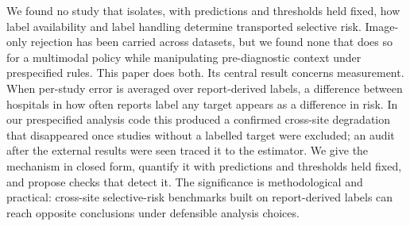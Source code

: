 We found no study that isolates, with predictions and thresholds held fixed,
how label availability and label handling determine transported selective risk.
Image-only rejection has been carried across datasets,\cite{aperstein2026} but
we found none that does so for a multimodal policy while manipulating
pre-diagnostic context under prespecified rules. This paper does both. Its
central result concerns measurement. When per-study error is averaged over
report-derived labels, a difference between hospitals in how often reports
label any target appears as a difference in risk. In our prespecified analysis
code this produced a confirmed cross-site degradation that disappeared once
studies without a labelled target were excluded; an audit after the external
results were seen traced it to the estimator. We give the mechanism in closed
form, quantify it with predictions and thresholds held fixed, and propose
checks that detect it. The significance is methodological and practical:
cross-site selective-risk benchmarks built on report-derived labels can reach
opposite conclusions under defensible analysis choices.
